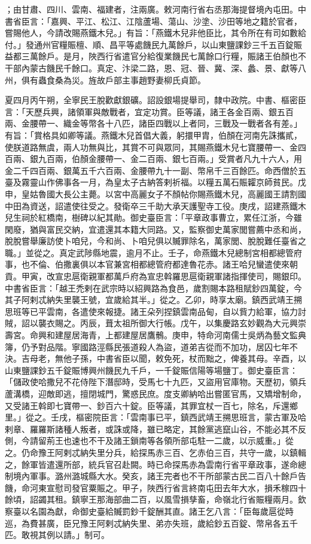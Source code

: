 \begin{pinyinscope}
；由甘肅、四川、雲南、福建者，注兩廣。敕河南行省右丞那海提督境內屯田。中書省臣言：「嘉興、平江、松江、江陰蘆場、蕩山、沙塗、沙田等地之籍於官者，嘗賜他人，今請改賜燕鐵木兒。」有旨：「燕鐵木兒非他臣比，其令所在有司如數給付。」發通州官糧賑檀、順、昌平等處饑民九萬餘戶，以山東鹽課鈔三千五百錠賑益都三萬餘戶。是月，陜西行省遣官分給復業饑民七萬餘口行糧，賑諸王伯顏也不干部內蒙古饑民千餘口。真定、汴梁二路，恩、冠、晉、冀、深、蠡、景、獻等八州，俱有蟲食桑為災。旌故戶部主事趙野妻柳氏貞節。



 夏四月丙午朔，全寧民王脫歡獻銀礦。詔設銀場提舉司，隸中政院。中書、樞密臣言：「天歷兵興，諸領軍與敵戰者，宜定功賞。臣等議，諸王各金百兩、銀五百兩、金腰帶一、織金等幣各十八匹，諸臣四戰以上者同，三戰及一戰者各有差。」有旨：「賞格具如卿等議。燕鐵木兒首倡大義，躬擐甲胄，伯顏在河南先誅攜貳，使朕道路無虞，兩人功無與比，其賞不可與眾同，其賜燕鐵木兒七寶腰帶一、金四百兩、銀九百兩，伯顏金腰帶一、金二百兩、銀七百兩。」受賞者凡九十六人，用金二千四百兩、銀萬五千六百兩、金腰帶九十一副、幣帛千三百餘匹。命西僧於五臺及霧靈山作佛事各一月，為皇太子古納答剌祈福。以糧五萬石賑糶京師貧民。戊申，皇姑魯國大長公主薨。以宮中高麗女子不顏帖你賜燕鐵木兒，高麗國王請割國中田為資送，詔遣使往受之。發衛卒三千助大承天護聖寺工役。庚戌，詔建燕鐵木兒生祠於紅橋南，樹碑以紀其勛。御史臺臣言：「平章政事曹立，累任江浙，今雖閑廢，猶與富民交納，宜遣還其本籍大同路。又，監察御史萬家閭嘗薦中丞和尚，脫脫嘗舉廉訪使卜咱兒，今和尚、卜咱兒俱以贓罪除名，萬家閭、脫脫難任臺省之職。」並從之。真定武陟縣地震，逾月不止。壬子，命燕鐵木兒總制宮相都總管府事，也不倫、伯撒裏俱以本官兼宮相都總管府都達魯花赤。諸王哈兒蠻遣使來朝貢。甲寅，改宣忠扈衛親軍都萬戶府為宣忠斡羅思扈衛親軍諸指揮使司，賜銀印。中書省臣言：「越王禿剌在武宗時以紹興路為食邑，歲割賜本路租賦鈔四萬錠，今其子阿剌忒納失里襲王號，宜歲給其半。」從之。乙卯，時享太廟。鎮西武靖王搠思班等已平雲南，各遣使來報捷。諸王朵列捏鎮雲南品甸，自以貲力給軍，協力討賊，詔以襲衣賜之。丙辰，葺太祖所御大行帳。戊午，以集慶路玄妙觀為大元興崇壽宮。命興和建屋居海青，上都建屋居鷹鶻。庚申，特命河南儒士吳炳為藝文監典簿，仍予對品階。寧國路涇縣民張道殺人為盜，道弟吉從而不加功，居囚七年不決。吉母老，無他子孫，中書省臣以聞，敕免死，杖而黜之，俾養其母。辛酉，以山東鹽課鈔五千錠賑博興州饑民九千戶，一千錠賑信陽等場鹽丁。御史臺臣言：「儲政使哈撒兒不花侍陛下潛邸時，受馬七十九匹，又盜用官庫物。天歷初，領兵蘆溝橋，迎敵即逃，擅閉城門，驚惑民庶。度支卿納哈出嘗匿官馬，又矯增制命，又受諸王斡即七寶帶一、鈔百六十錠。臣等議，其罪宜杖一百七，除名，斥還鄉里。」從之。壬戌，樞密院臣言：「雲南事已平，鎮西武靖王搠思班言，蒙古軍及哈剌章、羅羅斯諸種人叛者，或誅或降，雖已略定，其餘黨逃竄山谷，不能必其不反側，今請留荊王也速也不干及諸王鎖南等各領所部屯駐一二歲，以示威重。」從之。仍命豫王阿剌忒納失里分兵，給探馬赤三百、乞赤伯三百，共守一歲，以鎮輯之，餘軍皆遣還所部，統兵官召赴闕。時已命探馬赤為雲南行省平章政事，遂命總制境內軍事。潞州潞城縣大水。癸亥，諸王完者也不干所部蒙古民二百八十餘戶告饑，命河東宣慰司發官粟賑之。甲子，陜西行省言終南屯田去年大水，損禾稼四十餘頃，詔蠲其租。鎮寧王那海部曲二百，以風雪損孳畜，命嶺北行省賑糧兩月。欽察臺以名園為獻，命御史臺給贓罰鈔千錠酬其直。諸王乞八言：「臣每歲扈從時巡，為費甚廣，臣兄豫王阿剌忒納失里、弟亦失班，歲給鈔五百錠、幣帛各五千匹。敢視其例以請。」制可。
\end{pinyinscope}

